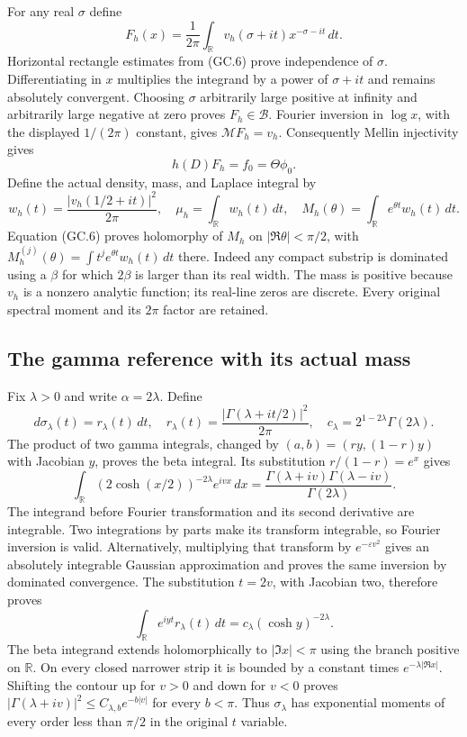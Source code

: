 \documentclass[11pt,a4paper]{article}
\begin{document}
For any real $\sigma$ define
\[
 F_h(x)=\frac1{2\pi}\int_{\mathbb R}
              v_h(\sigma+it)x^{-\sigma-it}\,dt.                \tag{GC.7}
\]
Horizontal rectangle estimates from (GC.6) prove independence of
$\sigma$. Differentiating in $x$ multiplies the integrand by a
power of $\sigma+it$ and remains absolutely convergent. Choosing
$\sigma$ arbitrarily large positive at infinity and arbitrarily
large negative at zero proves $F_h\in\mathscr B$. Fourier inversion
in $\log x$, with the displayed $1/(2\pi)$ constant, gives
$\mathcal MF_h=v_h$. Consequently Mellin injectivity gives
\[
 h(D)F_h=f_0=\Theta\phi_0.                                    \tag{GC.8}
\]
Define the actual density, mass, and Laplace integral by
\[
 w_h(t)=\frac{|v_h(1/2+it)|^2}{2\pi},\quad
 \mu_h=\int_{\mathbb R}w_h(t)\,dt,\quad
 M_h(\theta)=\int_{\mathbb R}e^{\theta t}w_h(t)\,dt.
                                                               \tag{GC.9}
\]
Equation (GC.6) proves holomorphy of $M_h$ on
$|\Re\theta|<\pi/2$, with
$M_h^{(j)}(\theta)=\int t^je^{\theta t}w_h(t)\,dt$ there.
Indeed any compact substrip is dominated using a $\beta$ for which
$2\beta$ is larger than its real width. The mass is positive because
$v_h$ is a nonzero analytic function; its real-line zeros are discrete.
Every original spectral moment and its $2\pi$ factor are retained.

\subsection{The gamma reference with its actual mass}

Fix $\lambda>0$ and write $\alpha=2\lambda$. Define
\[
 d\sigma_\lambda(t)=r_\lambda(t)\,dt,
 \quad r_\lambda(t)=\frac{|\Gamma(\lambda+it/2)|^2}{2\pi},
 \quad c_\lambda=2^{1-2\lambda}\Gamma(2\lambda).
                                                               \tag{GC.10}
\]
The product of two gamma integrals, changed by
$(a,b)=(ry,(1-r)y)$ with Jacobian $y$, proves the beta integral.
Its substitution $r/(1-r)=e^x$ gives
\[
 \int_{\mathbb R}(2\cosh(x/2))^{-2\lambda}e^{ivx}\,dx
 =\frac{\Gamma(\lambda+iv)\Gamma(\lambda-iv)}{\Gamma(2\lambda)}.
\]
The integrand before Fourier transformation and its second derivative
are integrable. Two integrations by parts make its transform
integrable, so Fourier inversion is valid. Alternatively, multiplying
that transform by $e^{-\varepsilon v^2}$ gives an absolutely
integrable Gaussian approximation and proves the same inversion by
dominated convergence. The substitution $t=2v$, with Jacobian two,
therefore proves
\[
 \int_{\mathbb R}e^{iyt}r_\lambda(t)\,dt
       =c_\lambda(\cosh y)^{-2\lambda}.                        \tag{GC.11}
\]
The beta integrand extends holomorphically to $|\Im x|<\pi$ using
the branch positive on $\mathbb R$. On every closed narrower strip
it is bounded by a constant times $e^{-\lambda|\Re x|}$.
Shifting the contour up for $v>0$ and down for $v<0$ proves
$|\Gamma(\lambda+iv)|^2\le C_{\lambda,b}e^{-b|v|}$ for every
$b<\pi$. Thus $\sigma_\lambda$ has exponential moments of every
order less than $\pi/2$ in the original $t$ variable.
\end{document}
